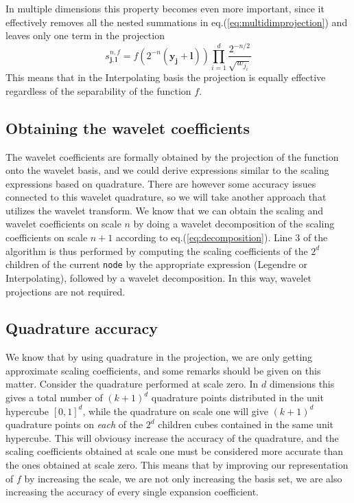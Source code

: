 \noindent
In multiple dimensions this property becomes even more important, since it 
effectively removes all the nested summations in
eq.(\ref{eq:multidimprojection}) and leaves only one term in the projection
\begin{equation}
	s^{n,f}_{\boldsymbol{j},\boldsymbol{l}} = 
	f(2^{-n}(\boldsymbol{y_j}+\boldsymbol{l}))\prod_{i=1}^d \frac{2^{-n/2}}
	{\sqrt{w_{j_i}}}
\end{equation}
This means that in the Interpolating basis the projection is equally effective 
regardless of the separability of the function $f$.

\subsection*{Obtaining the wavelet coefficients}
The wavelet coefficients are formally obtained by the projection of the
function onto the wavelet basis, and we could derive expressions similar to
the scaling expressions based on quadrature. There are however some accuracy
issues connected to this wavelet quadrature, so we will take another approach 
that utilizes the wavelet transform. We know that we can obtain the scaling and
wavelet coefficients on scale $n$ by doing a wavelet decomposition of the
scaling coefficients on scale $n+1$ according to eq.(\ref{eq:decomposition}).
Line 3 of the algorithm is thus performed by computing the scaling
coefficients of the $2^d$ children of the current \texttt{node} by the
appropriate expression (Legendre or Interpolating), followed by a wavelet
decomposition. In this way, wavelet projections are not required.

\subsection*{Quadrature accuracy}
We know that by using quadrature in the projection, we are only getting
approximate scaling coefficients, and some remarks should be given on 
this matter. Consider the quadrature performed at scale zero. In $d$
dimensions this gives a total number of $(k+1)^d$ quadrature points
distributed in the unit hypercube $[0,1]^d$, while the quadrature on scale one
will give $(k+1)^d$ quadrature points on \emph{each} of the $2^d$ children
cubes contained in the same unit hypercube. This will obviousy increase the 
accuracy of the quadrature, and the scaling coefficients obtained at scale one 
must be considered more accurate than the ones obtained at scale zero. This 
means that by improving our representation of $f$ by increasing the scale, we 
are not only increasing the basis set, we are also increasing the accuracy of 
every single expansion coefficient.\\

